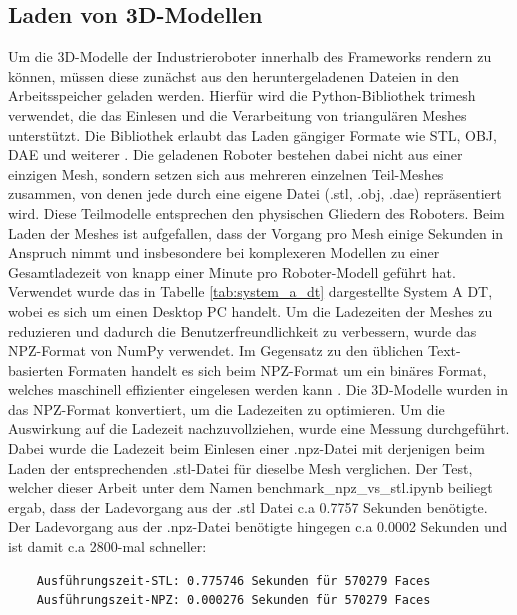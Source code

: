 \subsection{Laden von 3D-Modellen}
\label{subsec:Laden von 3D-Modellen}
Um die 3D-Modelle der Industrieroboter innerhalb des Frameworks rendern zu können,
müssen diese zunächst aus den heruntergeladenen Dateien in den Arbeitsspeicher geladen werden.
Hierfür wird die Python-Bibliothek trimesh verwendet, die das Einlesen und die Verarbeitung von triangulären Meshes unterstützt.
Die Bibliothek erlaubt das Laden gängiger Formate wie STL, OBJ, DAE und weiterer .
Die geladenen Roboter bestehen dabei nicht aus einer einzigen Mesh,
sondern setzen sich aus mehreren einzelnen Teil-Meshes zusammen, von denen jede durch eine eigene Datei (.stl, .obj, .dae) repräsentiert wird.
Diese Teilmodelle entsprechen den physischen Gliedern des Roboters.
Beim Laden der Meshes ist aufgefallen, dass der Vorgang pro Mesh einige Sekunden in Anspruch nimmt und insbesondere bei komplexeren Modellen
zu einer Gesamtladezeit von knapp einer Minute pro Roboter-Modell geführt hat.
Verwendet wurde das in Tabelle \ref{tab:system_a_dt} dargestellte System A DT, wobei es sich um einen Desktop PC handelt.
Um die Ladezeiten der Meshes zu reduzieren und dadurch die Benutzerfreundlichkeit zu verbessern, wurde das NPZ-Format von NumPy verwendet.
Im Gegensatz zu den üblichen Text-basierten Formaten handelt es sich beim NPZ-Format um ein binäres Format,
welches maschinell effizienter eingelesen werden kann .
Die 3D-Modelle wurden in das NPZ-Format konvertiert, um die Ladezeiten zu optimieren.
Um die Auswirkung auf die Ladezeit nachzuvollziehen, wurde eine Messung durchgeführt.
Dabei wurde die Ladezeit beim Einlesen einer .npz-Datei mit derjenigen beim Laden der entsprechenden .stl-Datei für dieselbe Mesh verglichen.
Der Test, welcher dieser Arbeit unter dem Namen benchmark\_npz\_vs\_stl.ipynb beiliegt ergab, dass der Ladevorgang aus der .stl Datei
c.a 0.7757 Sekunden benötigte. Der Ladevorgang aus der .npz-Datei benötigte hingegen c.a 0.0002 Sekunden und ist damit c.a 2800-mal schneller:

\begin{center}
    \begin{verbatim}
    Ausführungszeit-STL: 0.775746 Sekunden für 570279 Faces
    Ausführungszeit-NPZ: 0.000276 Sekunden für 570279 Faces
    \end{verbatim}
\end{center}

